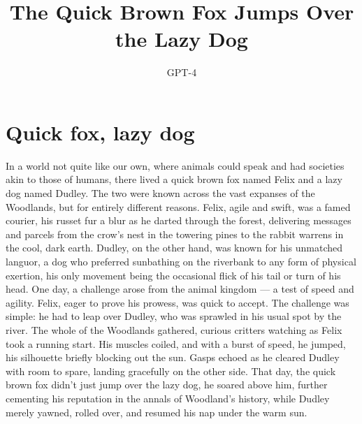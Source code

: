 \documentclass[11pt]{article}
\title{The Quick Brown Fox Jumps Over the Lazy Dog}
\author{GPT-4}
\begin{document}
\section{Quick fox, lazy dog}

In a world not quite like our own, where animals could speak and had societies akin to those of humans, there lived a
quick brown fox named Felix and a lazy dog named Dudley. The two were known across the vast expanses of the Woodlands,
but for entirely different reasons. Felix, agile and swift, was a famed courier, his russet fur a blur as he darted
through the forest, delivering messages and parcels from the crow's nest in the towering pines to the rabbit warrens in
the cool, dark earth. Dudley, on the other hand, was known for his unmatched languor, a dog who preferred sunbathing on
the riverbank to any form of physical exertion, his only movement being the occasional flick of his tail or turn of his
head. One day, a challenge arose from the animal kingdom — a test of speed and agility. Felix, eager to prove his
prowess, was quick to accept. The challenge was simple: he had to leap over Dudley, who was sprawled in his usual spot
by the river. The whole of the Woodlands gathered, curious critters watching as Felix took a running start. His muscles
coiled, and with a burst of speed, he jumped, his silhouette briefly blocking out the sun. Gasps echoed as he cleared
Dudley with room to spare, landing gracefully on the other side. That day, the quick brown fox didn't just jump over the
 lazy dog, he soared above him, further cementing his reputation in the annals of Woodland's history, while Dudley
 merely yawned, rolled over, and resumed his nap under the warm sun.
\end{document}
